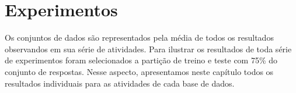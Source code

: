 \chapter{Experimentos}

Os conjuntos de dados são representados pela média de todos os resultados observandos em sua série de atividades. Para ilustrar os resultados de toda série de experimentos foram selecionados a partição de treino e teste com 75\% do conjunto de respostas. Nesse aspecto, apresentamos neste capítulo todos os resultados individuais para as atividades de cada base de dados.

